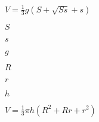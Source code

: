 \documentclass{amsart}
\begin{document}
 
\huge
$V = \frac{1}{3}g(S+\sqrt{Ss}+s)$


\newpage

$S$


\newpage

$s$


\newpage

$g$


\newpage

$R$


\newpage

$r$


\newpage

$h$


\newpage

$V = \frac{1}{3}\pi h(R^{2}+Rr+r^{2})$


\newpage
\end{document}
